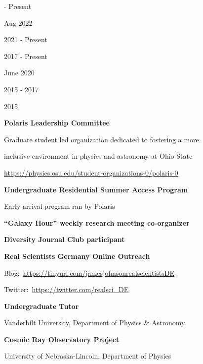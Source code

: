 \documentclass[cv.tex]{subfiles}
\begin{document}
\parbox{0.18\textwidth}{%
	 - Present \par
	\null \par
	\null \par
	\null\par
	Aug 2022 \par
	\null \par
	2021 - Present \par
	2017 - Present \par
	June 2020 \par
	\null \par
	\null \par
	2015 - 2017 \par
	\null \par
	2015 \par
	\null
}
\hspace{1mm}
\parbox{0.8\textwidth}{%
	\vspace{1mm}
	\textbf{Polaris Leadership Committee} \par
	Graduate student led organization dedicated to fostering a more \par
	inclusive environment in physics and astronomy at Ohio State \par
	\url{https://physics.osu.edu/student-organizations-0/polaris-0} \par
	\textbf{Undergraduate Residential Summer Access Program} \par
	Early-arrival program ran by Polaris \par
	\textbf{``Galaxy Hour'' weekly research meeting co-organizer} \par
	\textbf{Diversity Journal Club participant} \par
	\textbf{Real Scientists Germany Online Outreach} \par
	Blog:~\url{https://tinyurl.com/jamesjohnsonrealscientistsDE} \par
	Twitter:~\url{https://twitter.com/realsci_DE} \par
	\textbf{Undergraduate Tutor} \par
	Vanderbilt University, Department of Physics \& Astronomy \par
	\textbf{Cosmic Ray Observatory Project} \par
	University of Nebraska-Lincoln, Department of Physics
}
\end{document}
